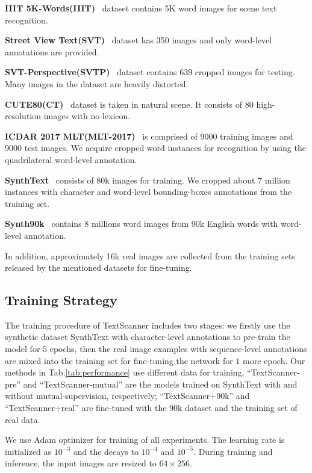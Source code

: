 \documentclass[letterpaper]{article} \usepackage{aaai20}  \usepackage{times}  \usepackage{helvet} \usepackage{courier}  \usepackage[hyphens]{url}  \usepackage{graphicx} \urlstyle{rm} \def\UrlFont{\rm}  \usepackage{graphicx}  \frenchspacing  \setlength{\pdfpagewidth}{8.5in}  \setlength{\pdfpageheight}{11in}
\begin{document}
\noindent\textbf{IIIT 5K-Words(IIIT)}~\cite{mishra2012scene} dataset contains 5K word images for scene text recognition. 

\noindent\textbf{Street View Text(SVT)}~\cite{wang2011end} dataset
has 350 images and only word-level annotations are provided.

\noindent\textbf{SVT-Perspective(SVTP)}~\cite{quy2013recognizing} dataset contains 639 cropped images for testing. Many images in the dataset are heavily distorted. 

\noindent\textbf{CUTE80(CT)}~\cite{cute} dataset is taken in natural scene. It consists of 80 high-resolution images with no lexicon.

\noindent\textbf{ICDAR 2017 MLT(MLT-2017)}~\cite{nayef2017}
is comprised of 9000 training images and 9000 test images. We acquire cropped word instances for recognition by using the quadrilateral word-level annotation.

\noindent\textbf{SynthText}~\cite{synthtext} consists of 80k images for training. We cropped about 7 million instances with character and word-level bounding-boxes annotations from the training set.

\noindent\textbf{Synth90k}~\cite{mjsynth} contains 8 millions word images from 90k English words with word-level annotation.

In addition, approximately 16k real images are collected from the training sets released by the mentioned datasets for fine-tuning.

\subsection{Training Strategy}
The training procedure of TextScanner includes two stages: we firstly use the synthetic dataset SynthText with character-level annotations to pre-train the model for $5$ epochs, then the real image examples with sequence-level annotations are mixed into the training set for fine-tuning the network for $1$ more epoch. Our methods in Tab.\ref{tab:performance} use different data for training, ``TextScanner-pre'' and ``TextScanner-mutual'' are the models trained on SynthText with and without mutual-supervision, respectively; ``TextScanner+90k'' and ``TextScanner+real'' are fine-tuned with the 90k dataset and the training set of real data.

We use Adam optimizer for training of all experiments. The learning rate is initialized as $10^{-3}$ and the decays to $10^{-4}$ and $10^{-5}$. During training and inference, the input images are resized to $64\times256$.
\end{document}
